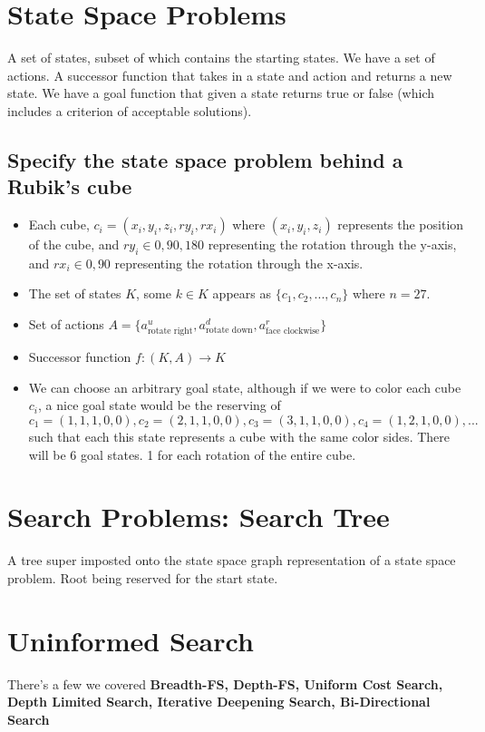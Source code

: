 \documentclass{article}
\begin{document}
\section{State Space Problems}
A set of states, subset of which contains the starting states. We have a set of actions. A successor function that takes in a state and action and returns a new state. We have a goal function that given a state returns true or false (which includes a criterion of acceptable solutions).

\subsection{Specify the state space problem behind a Rubik's cube}
\begin{itemize}
	\item Each cube, $c_{i} = (x_{i}, y_{i}, z_{i}, ry_{i}, rx_{i})$ where $(x_{i},y_{i},z_{i})$ represents the position of the cube, and $ry_{i} \in {0, 90, 180}$ representing the rotation through the y-axis, and $rx_{i} \in {0, 90}$ representing the rotation through the x-axis.
	\item The set of states $K$, some $k \in K$ appears as $\{c_1, c_2, ..., c_n\}$ where $n=27$.
	\item Set of actions $A = \{ a^u_{\text{rotate right}}, a^d_{\text{rotate down}}, a^r_{\text{face clockwise}} \}$
	\item Successor function $f: (K, A) \rightarrow K$
	\item We can choose an arbitrary goal state, although if we were to color each cube $c_i$, a nice goal state would be the reserving of $c_1 = (1,1,1,0,0), c_2 = (2, 1, 1, 0, 0), c_3 = (3, 1, 1, 0, 0), c_4 = (1, 2, 1, 0, 0), ...$ such that each this state represents a cube with the same color sides. There will be 6 goal states. 1 for each rotation of the entire cube.
\end{itemize}

\section{Search Problems: Search Tree}
A tree super imposted onto the state space graph representation of a state space problem. Root being reserved for the start state.

\section{Uninformed Search}
There's a few we covered \textbf{Breadth-FS, Depth-FS, Uniform Cost Search, Depth Limited Search, Iterative Deepening Search, Bi-Directional Search}
\end{document}
